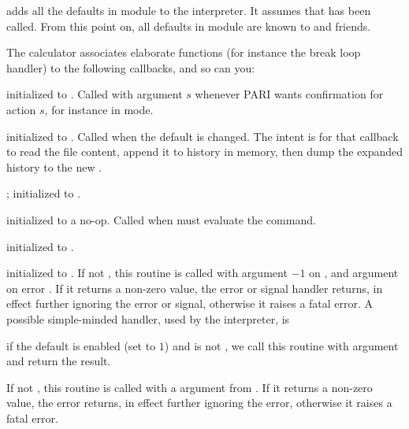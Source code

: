  adds all the defaults in
module  to the interpreter. It assumes that  has
been called. From this point on, all defaults in module  are known
to  and friends.


The  calculator associates elaborate functions (for instance the
break loop handler) to the following callbacks, and so can you:

initialized to . Called with argument $s$ whenever PARI wants
confirmation for action $s$, for instance in  mode.

initialized to . Called when the  default
is changed. The intent is for that callback to read the file content, append
it to history in memory, then dump the expanded history to the new
.

;
initialized to .

initialized to a no-op. Called when  must evaluate the 
command.

initialized to .

initialized to . If not , this routine is called with
argument $-1$ on , and argument  on error . If
it returns a non-zero value, the error or signal handler returns, in effect
further ignoring the error or signal, otherwise it raises a fatal error.
A possible simple-minded handler, used by the  interpreter, is

 if the 
default is enabled (set to $1$) and  is not
, we call this routine with  argument and return the
result.

If not , this routine is called with a  argument
from . If it returns a non-zero value, the error returns, in
effect further ignoring the error, otherwise it raises a fatal error.


